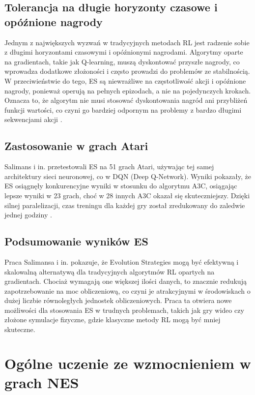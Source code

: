 \subsection{Tolerancja na długie horyzonty czasowe i opóźnione nagrody}
Jednym z największych wyzwań w tradycyjnych metodach RL jest radzenie sobie z długimi horyzontami czasowymi i opóźnionymi nagrodami. Algorytmy oparte na gradientach, takie jak Q-learning, muszą dyskontować przyszłe nagrody, co wprowadza dodatkowe złożoności i często prowadzi do problemów ze stabilnością. W przeciwieństwie do tego, ES są niewrażliwe na częstotliwość akcji i opóźnione nagrody, ponieważ operują na pełnych epizodach, a nie na pojedynczych krokach. Oznacza to, że algorytm nie musi stosować dyskontowania nagród ani przybliżeń funkcji wartości, co czyni go bardziej odpornym na problemy z bardzo długimi sekwencjami akcji \cite{EV}.

\subsection{Zastosowanie w grach Atari}
Salimans i in. przetestowali ES na 51 grach Atari, używając tej samej architektury sieci neuronowej, co w DQN (Deep Q-Network). Wyniki pokazały, że ES osiągnęły konkurencyjne wyniki w stosunku do algorytmu A3C, osiągając lepsze wyniki w 23 grach, choć w 28 innych A3C okazał się skuteczniejszy. Dzięki silnej paralelizacji, czas treningu dla każdej gry został zredukowany do zaledwie jednej godziny \cite{EV}.

\subsection{Podsumowanie wyników ES}
Praca Salimansa i in. \cite{EV} pokazuje, że Evolution Strategies mogą być efektywną i skalowalną alternatywą dla tradycyjnych algorytmów RL opartych na gradientach. Chociaż wymagają one większej ilości danych, to znacznie redukują zapotrzebowanie na moc obliczeniową, co czyni je atrakcyjnymi w środowiskach o dużej liczbie równoległych jednostek obliczeniowych. Praca ta otwiera nowe możliwości dla stosowania ES w trudnych problemach, takich jak gry wideo czy złożone symulacje fizyczne, gdzie klasyczne metody RL mogą być mniej skuteczne.

\section{Ogólne uczenie ze wzmocnieniem w grach NES}

